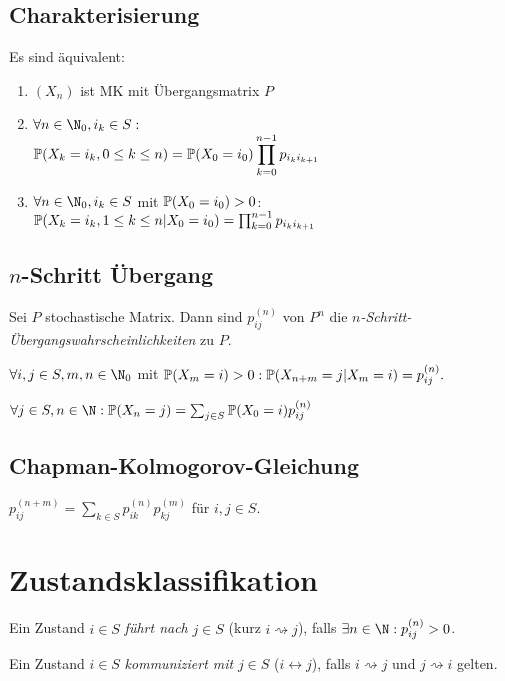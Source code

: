 \subsection*{Charakterisierung}

Es sind äquivalent:

\begin{enumerate}[label=(\alph*)]
	\item $(X_n)$ ist MK mit Übergangsmatrix $P$
	\item $\forall n \in \N_0, i_k \in S :$ \vspace*{-2mm} \\ $\P(X_k = i_k, 0 \leq k \leq n) = \P(X_0 = i_0) \displaystyle\prod_{k=0}^{n-1} p_{i_k i_{k+1}}$
	\item $\forall n \in \N_0, i_k \in S$ mit $\P(X_0 = i_0) > 0$: \\ $\P(X_k = i_k, 1 \leq k \leq n | X_0 = i_0) = \prod_{k=0}^{n-1} p_{i_k i_{k+1}}$
\end{enumerate}

\subsection*{$n$-Schritt Übergang}

Sei $P$ stochastische Matrix. Dann sind $p_{ij}^{(n)}$ von $P^n$ die \emph{$n$-Schritt-Übergangswahrscheinlichkeiten} zu $P$.

$\forall i, j \in S, m, n \in \N_0$ mit $\P(X_m = i) > 0 : \\ \P(X_{n+m} = j | X_m = i) = p_{ij}^{(n)}.$

$\forall j \in S, n \in \N : \P(X_n = j) = \sum_{j \in S} \P(X_0 = i) p_{ij}^{(n)}$

\subsection*{Chapman-Kolmogorov-Gleichung}

$p_{ij}^{(n+m)} = \displaystyle\sum_{k \in S} p_{ik}^{(n)} p_{kj}^{(m)}$ für $i, j \in S$.

\section*{Zustandsklassifikation}

Ein Zustand $i \in S$ \emph{führt nach} $j \in S$ (kurz $i \rightsquigarrow j$), falls $\exists n \in \N : p_{ij}^{(n)} > 0$.

Ein Zustand $i \in S$ \emph{kommuniziert mit} $j \in S$ ($i \leftrightarrow j$), falls $i \rightsquigarrow j$ und $j \rightsquigarrow i$ gelten.

